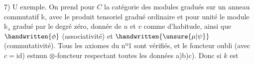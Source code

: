 7) U exemple. On prend pour $C$ la catégorie des modules gradués sur un anneau commutatif $\mathbb{k}$, avec le produit tensoriel gradué ordinaire et pour unité le module $\mathbb{k}_s$ gradué par le degré zéro, donnée de $u$ et $v$ comme d'habitude, ainsi que $\handwritten{\phi}$ (associativité) et $\handwritten{\unsure{\mu|\psi}}$ (commutativité). Tous les axiomes du nº1 sont vérifiés, et le foncteur oubli (avec $c=\mathrm{id}$) estnun $\otimes$-foncteur respectant toutes les données a)b)c). Donc si $k$ est

